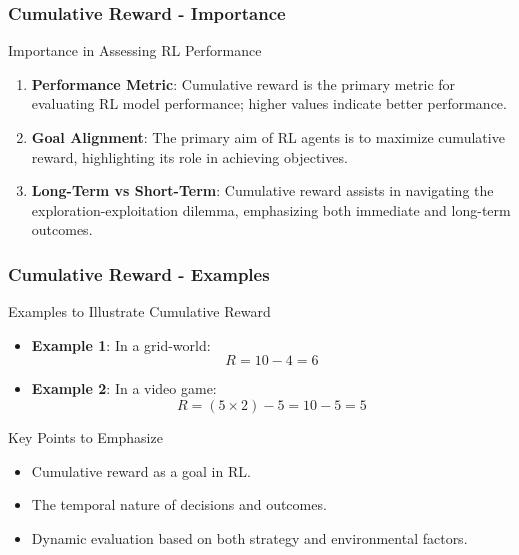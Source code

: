 \documentclass{beamer}
\begin{document}
\begin{frame}[fragile]
    \frametitle{Cumulative Reward - Importance}
    \begin{block}{Importance in Assessing RL Performance}
        \begin{enumerate}
            \item \textbf{Performance Metric}: Cumulative reward is the primary metric for evaluating RL model performance; higher values indicate better performance.
            \item \textbf{Goal Alignment}: The primary aim of RL agents is to maximize cumulative reward, highlighting its role in achieving objectives.
            \item \textbf{Long-Term vs Short-Term}: Cumulative reward assists in navigating the exploration-exploitation dilemma, emphasizing both immediate and long-term outcomes.
        \end{enumerate}
    \end{block}
\end{frame}

\begin{frame}[fragile]
    \frametitle{Cumulative Reward - Examples}
    \begin{block}{Examples to Illustrate Cumulative Reward}
        \begin{itemize}
            \item \textbf{Example 1}: In a grid-world:
                \[
                R = 10 - 4 = 6
                \]
            \item \textbf{Example 2}: In a video game:
                \[
                R = (5 \times 2) - 5 = 10 - 5 = 5
                \]
        \end{itemize}
        
        \begin{block}{Key Points to Emphasize}
            \begin{itemize}
                \item Cumulative reward as a goal in RL.
                \item The temporal nature of decisions and outcomes.
                \item Dynamic evaluation based on both strategy and environmental factors.
            \end{itemize}
        \end{block}
    \end{block}
\end{frame}
\end{document}
